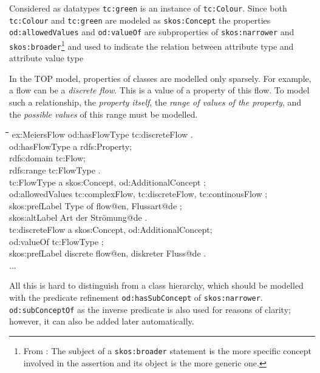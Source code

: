 \documentclass[11pt,a4paper]{article}
\newenvironment{code}{\tt \begin{tabbing}
\hskip12pt\=\hskip12pt\=\hskip12pt\=\hskip12pt\=\hskip5cm\=\hskip5cm\=\kill}
{\end{tabbing}}
\def\dq{{\char34}}
\begin{document}
Considered as datatypes \texttt{tc:green} is an instance of
\texttt{tc:Colour}.  Since both \texttt{tc:Colour} and \texttt{tc:green} are
modeled as \texttt{skos:Concept} the properties \texttt{od:allowedValues} and
\texttt{od:valueOf} are subproperties of \texttt{skos:narrower} and
\texttt{skos:broader}\footnote{From \cite{SKOS-Primer}: The subject of a
  \texttt{skos:broader} statement is the more specific concept involved in the
  assertion and its object is the more generic one.} and used to indicate the
relation between attribute type and attribute value type

In the TOP model, properties of classes are modelled only sparsely.  For
example, a flow can be a \emph{discrete flow}. This is a value of a property
of this flow. To model such a relationship, the \emph{property itself}, the
\emph{range of values of the property}, and the \emph{possible values} of this
range must be modelled.

\begin{code}
  ex:MeiersFlow od:hasFlowType tc:discreteFlow . \\[4pt]
  
  od:hasFlowType a rdfs:Property;\\
    \>rdfs:domain tc:Flow;\\
    \>rdfs:range tc:FlowType .\\[4pt]

  tc:FlowType a skos:Concept, od:AdditionalConcept ;\\
    \>od:allowedValues tc:complexFlow, tc:discreteFlow, tc:continousFlow ;\\
    \>skos:prefLabel {\dq}Type of flow{\dq}@en, {\dq}Flussart{\dq}@de ;\\
    \>skos:altLabel {\dq}Art der Strömung{\dq}@de .\\[4pt]
  
  tc:discreteFlow a skos:Concept, od:AdditionalConcept;\\
    \>od:valueOf tc:FlowType ; \\
    \>skos:prefLabel {\dq}discrete flow{\dq}@en, {\dq}diskreter Fluss{\dq}@de .\\[4pt] 
  ...  
\end{code}

All this is hard to distinguish from a class hierarchy, which should be
modelled with the predicate refinement \texttt{od:hasSubConcept} of
\texttt{skos:narrower}.  \texttt{od:subConceptOf} as the inverse predicate is
also used for reasons of clarity; however, it can also be added later
automatically.
\end{document}
